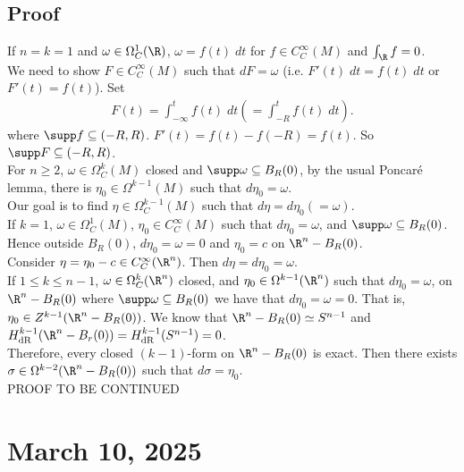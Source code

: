 \documentclass[11pt]{article}
\begin{document}
\subsection*{Proof}
\label{sec:orgd5a9671}
If \(n=k=1\) and \(\omega\in\Omega^{1}_{C}(\R)\), \(\omega=f(t)\;dt\) for \(f\in C^{\infty}_{C}(M)\) and \(\int_{\R}f=0\).\\
We need to show \(F\in C^{\infty}_{C}(M)\) such that \(dF=\omega\) (i.e. \(F'(t)\;dt=f(t)\;dt\) or \(F'(t)=f(t)\)). Set\\
\begin{align*}
  F(t)
  =\int_{-\infty}^{t}f(t)\;dt
  \left( =\int_{-R}^{t}f(t)\;dt \right).
\end{align*}
where \(\supp f\subseteq(-R,R)\). \(F'(t)=f(t)-f(-R)=f(t)\). So \(\supp F\subseteq(-R,R)\).\\
For \(n\geq 2\), \(\omega\in\Omega^{k}_{C}(M)\) closed and \(\supp\omega\subseteq B_{R}(0)\), by the usual Poncaré lemma, there is \(\eta_{0}\in\Omega^{k-1}(M)\) such that \(d\eta_{0}=\omega\).\\
Our goal is to find \(\eta\in\Omega^{k-1}_{C}(M)\) such that \(d\eta=d\eta_{0}(=\omega)\).\\
If \(k=1\), \(\omega\in\Omega^{1}_{C}(M)\), \(\eta_{0}\in C^{\infty}_{C}(M)\) such that \(d\eta_{0}=\omega\), and \(\supp\omega\subseteq B_{R}(0)\). Hence outside \(B_{R}(0)\), \(d\eta_{0}=\omega=0\) and \(\eta_{0}=c\) on \(\R^{n}-B_{R}(0)\).\\
Consider \(\eta=\eta_{0}-c\in C^{\infty}_{C}(\R^{n})\). Then \(d\eta=d\eta_{0}=\omega\).\\
If \(1\leq k\leq n-1\), \(\omega\in\Omega^{k}_{C}(\R^{n})\) closed, and \(\eta_{0}\in\Omega^{k-1}(\R^{n})\) such that \(d\eta_{0}=\omega\), on \(\R^{n}-B_{R}(0)\) where \(\supp\omega\subseteq B_{R}(0)\) we have that \(d\eta_{0}=\omega=0\). That is, \(\eta_{0}\in Z^{k-1}(\R^{n}-B_{R}(0))\). We know that \(\R^{n}-B_{R}(0)\simeq S^{n-1}\) and \(H^{k-1}_{\text{dR}}(\R^{n}-B_{r}(0))=H^{k-1}_{\text{dR}}(S^{n-1})=0\).\\
Therefore, every closed \((k-1)\)-form on \(\R^{n}-B_{R}(0)\) is exact. Then there exists \(\sigma\in\Omega^{k-2}(\R^{n}-B_{R}(0))\) such that \(d\sigma=\eta_{0}\).\\
PROOF TO BE CONTINUED\\
\section*{March 10, 2025}
\label{sec:org966e868}
\end{document}
